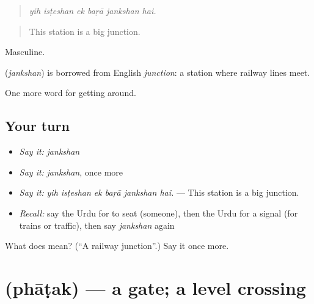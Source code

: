 \begin{quote}
     
\end{quote}

\begin{quote}
\emph{yih isṭeshan ek baṛā jankshan hai.}
\end{quote}

\begin{quote}
This station is a big junction.
\end{quote}

Masculine.

\begin{cousinweb}
\textbf{} (\emph{jankshan}) is borrowed from English \emph{junction}: a station where railway lines meet.
\end{cousinweb}

\begin{grammarlens}[title={What you've built}]
One more word for getting around.
\end{grammarlens}

\subsection*{Your turn}
\begin{itemize}
\raggedright
  \item \emph{Say it:} \emph{jankshan}
  \item \emph{Say it:} \emph{jankshan}, once more
  \item \emph{Say it:} \emph{yih isṭeshan ek baṛā jankshan hai.} — This station is a big junction.
  \item \emph{Recall:} say the Urdu for to seat (someone), then the Urdu for a signal (for trains or traffic), then say \emph{jankshan} again
\end{itemize}

\begin{tcolorbox}[breakable,colback=teal!4,colframe=teal!35!black,title={Before you move on}]
What does  mean? (\textquotedblleft{}A railway junction\textquotedblright{}.) Say it once more.
\end{tcolorbox}
\section[\texorpdfstring{\ur{پھاٹک} (phāṭak)}{پھاٹک (phāṭak)}]{ (phāṭak) — a gate; a level crossing}

\label{lesson:UR-C388-phatak}



